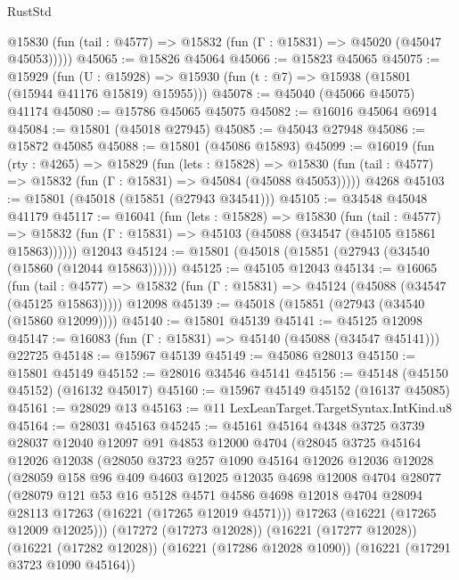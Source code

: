 \begin{lexlean}{RustStd}
\begin{coremodule}
      @15830 (fun (tail : @4577) => @15832 (fun (Γ : @15831) => @45020 (@45047 @45053)))))
@45065 := @15826 @45064
@45066 := @15823 @45065
@45075 := @15929
    (fun (U : @15928) => @15930 (fun (t : @7) => @15938 (@15801 (@15944 @41176 @15819) @15955)))
@45078 := @45040 (@45066 @45075) @41174
@45080 := @15786 @45065 @45075
@45082 := @16016 @45064 @6914
@45084 := @15801 (@45018 @27945)
@45085 := @45043 @27948
@45086 := @15872 @45085
@45088 := @15801 (@45086 @15893)
@45099 := @16019
    (fun (rty : @4265) =>
    @15829
      (fun (lets : @15828) =>
      @15830 (fun (tail : @4577) => @15832 (fun (Γ : @15831) => @45084 (@45088 @45053)))))
    @4268
@45103 := @15801 (@45018 (@15851 (@27943 @34541)))
@45105 := @34548 @45048 @41179
@45117 := @16041
    (fun (lets : @15828) =>
    @15830
      (fun (tail : @4577) =>
      @15832 (fun (Γ : @15831) => @45103 (@45088 (@34547 (@45105 @15861 @15863))))))
    @12043
@45124 := @15801 (@45018 (@15851 (@27943 (@34540 (@15860 (@12044 @15863))))))
@45125 := @45105 @12043
@45134 := @16065
    (fun (tail : @4577) => @15832 (fun (Γ : @15831) => @45124 (@45088 (@34547 (@45125 @15863)))))
    @12098
@45139 := @45018 (@15851 (@27943 (@34540 (@15860 @12099))))
@45140 := @15801 @45139
@45141 := @45125 @12098
@45147 := @16083 (fun (Γ : @15831) => @45140 (@45088 (@34547 @45141))) @22725
@45148 := @15967 @45139
@45149 := @45086 @28013
@45150 := @15801 @45149
@45152 := @28016 @34546 @45141
@45156 := @45148 (@45150 @45152) (@16132 @45017)
@45160 := @15967 @45149 @45152 (@16137 @45085)
@45161 := @28029 @13
@45163 := @11 LexLeanTarget.TargetSyntax.IntKind.u8
@45164 := @28031 @45163
@45245 := @45161
    @45164
    @4348
    @3725
    @3739
    @28037
    @12040
    @12097
    @91
    @4853
    @12000
    @4704
    (@28045
      @3725
      @45164
      @12026
      @12038
      (@28050
        @3723
        @257
        @1090
        @45164
        @12026
        @12036
        @12028
        (@28059
          @158
          @96
          @409
          @4603
          @12025
          @12035
          @4698
          @12008
          @4704
          @28077
          (@28079
            @121
            @53
            @16
            @5128
            @4571
            @4586
            @4698
            @12018
            @4704
            @28094
            @28113
            @17263
            (@16221 (@17265 @12019 @4571)))
          @17263
          (@16221 (@17265 @12009 @12025)))
        (@17272 (@17273 @12028))
        (@16221 (@17277 @12028))
        (@16221 (@17282 @12028))
        (@16221 (@17286 @12028 @1090))
        (@16221 (@17291 @3723 @1090 @45164))

\end{coremodule}
\end{lexlean}

